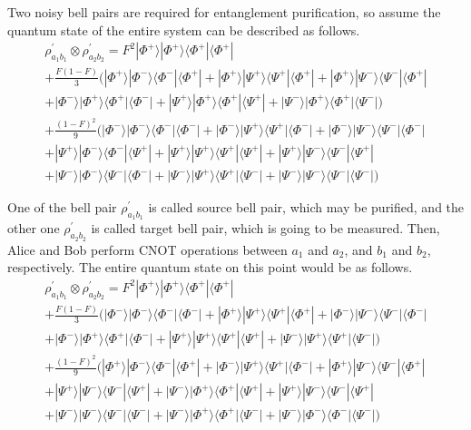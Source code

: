 Two noisy bell pairs are required for entanglement purification, so assume the quantum state of the entire system can be described as follows.
\begin{multline*}
\rho^{'}_{a_1 b_1} \otimes \rho^{'}_{a_2 b_2} = F^2|\Phi^+\rangle|\Phi^+\rangle\langle\Phi^+|\langle\Phi^+| \\ 
+ \frac{F(1-F)}{3}(|\Phi^+\rangle|\Phi^-\rangle\langle\Phi^-|\langle\Phi^+|+|\Phi^+\rangle|\Psi^+\rangle\langle\Psi^+|\langle\Phi^+|+|\Phi^+\rangle|\Psi^-\rangle\langle\Psi^-|\langle\Phi^+| \\
+|\Phi^-\rangle|\Phi^+\rangle\langle\Phi^+|\langle\Phi^-|+|\Psi^+\rangle|\Phi^+\rangle\langle\Phi^+|\langle\Psi^+|+|\Psi^-\rangle|\Phi^+\rangle\langle\Phi^+|\langle\Psi^-|) \\ 
+ \frac{(1-F)^2}{9}(|\Phi^-\rangle|\Phi^-\rangle\langle\Phi^-|\langle\Phi^-|+|\Phi^-\rangle|\Psi^+\rangle\langle\Psi^+|\langle\Phi^-|+|\Phi^-\rangle|\Psi^-\rangle\langle\Psi^-|\langle\Phi^-| \\
+ |\Psi^+\rangle|\Phi^-\rangle\langle\Phi^-|\langle\Psi^+|+|\Psi^+\rangle|\Psi^+\rangle\langle\Psi^+|\langle\Psi^+|+|\Psi^+\rangle|\Psi^-\rangle\langle\Psi^-|\langle\Psi^+| \\
+|\Psi^-\rangle|\Phi^-\rangle\langle\Psi^-|\langle\Phi^-|+|\Psi^-\rangle|\Psi^+\rangle\langle\Psi^+|\langle\Psi^-|+|\Psi^-\rangle|\Psi^-\rangle\langle\Psi^-|\langle\Psi^-|)
\end{multline*}

One of the bell pair $\rho^{'}_{a_1 b_1}$ is called source bell pair, which may be purified, and the other one $\rho^{'}_{a_2 b_2}$  is called target bell pair, which is going to be measured. Then, Alice and Bob perform CNOT operations between $a_1$ and $a_2$, and $b_1$ and $b_2$, respectively.
The entire quantum state on this point would be as follows.
\begin{multline*}
  \rho^{'}_{a_1 b_1} \otimes \rho^{'}_{a_2 b_2} = F^2|\Phi^+\rangle|\Phi^+\rangle\langle\Phi^+|\langle\Phi^+| \\ 
  + \frac{F(1-F)}{3}(|\Phi^-\rangle|\Phi^-\rangle\langle\Phi^-|\langle\Phi^-|+|\Phi^+\rangle|\Psi^+\rangle\langle\Psi^+|\langle\Phi^+|+|\Phi^-\rangle|\Psi^-\rangle\langle\Psi^-|\langle\Phi^-| \\
  +|\Phi^-\rangle|\Phi^+\rangle\langle\Phi^+|\langle\Phi^-|+|\Psi^+\rangle|\Psi^+\rangle\langle\Psi^+|\langle\Psi^+|+|\Psi^-\rangle|\Psi^+\rangle\langle\Psi^+|\langle\Psi^-|) \\ 
  + \frac{(1-F)^2}{9}(|\Phi^+\rangle|\Phi^-\rangle\langle\Phi^-|\langle\Phi^+|+|\Phi^-\rangle|\Psi^+\rangle\langle\Psi^+|\langle\Phi^-|+|\Phi^+\rangle|\Psi^-\rangle\langle\Psi^-|\langle\Phi^+| \\
  + |\Psi^+\rangle|\Psi^-\rangle\langle\Psi^-|\langle\Psi^+|+|\Psi^-\rangle|\Phi^+\rangle\langle\Phi^+|\langle\Psi^+|+|\Psi^+\rangle|\Psi^-\rangle\langle\Psi^-|\langle\Psi^+| \\
  +|\Psi^-\rangle|\Psi^-\rangle\langle\Psi^-|\langle\Psi^-|+|\Psi^-\rangle|\Phi^+\rangle\langle\Phi^+|\langle\Psi^-|+|\Psi^-\rangle|\Phi^-\rangle\langle\Phi^-|\langle\Psi^-|)
  \end{multline*}

